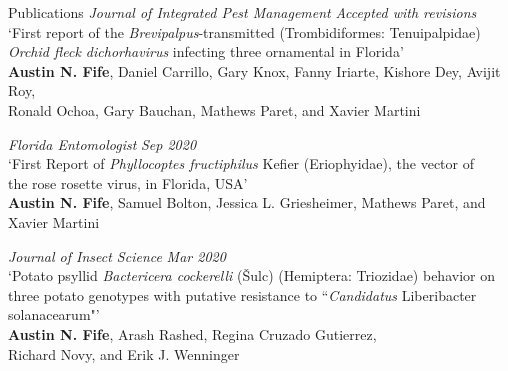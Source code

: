 \documentclass{resume} %
\begin{document}
\begin{rSection}{Publications}
\textit{Journal of Integrated Pest Management} \hfill {\em \textit{Accepted with revisions}}\\
`First report of the \textit{Brevipalpus}-transmitted (Trombidiformes: Tenuipalpidae)\\
\textit{Orchid fleck dichorhavirus} infecting three ornamental in Florida'\\
\textbf{Austin N. Fife}, Daniel Carrillo, Gary Knox, Fanny Iriarte, Kishore Dey, Avijit Roy,\\
 Ronald Ochoa, Gary Bauchan, Mathews Paret, and Xavier Martini \hfill
 
\textit{Florida Entomologist} \hfill {\em \textit{Sep 2020}}\\
`First Report of \textit{Phyllocoptes fructiphilus} Kefier (Eriophyidae), the vector of\\
the rose rosette virus, in Florida, USA'\\
\textbf{Austin N. Fife}, Samuel Bolton, Jessica L. Griesheimer, Mathews Paret, and Xavier Martini \hfill

\textit{Journal of Insect Science} \hfill {\em \textit{Mar 2020}}\\
`Potato psyllid \textit{Bactericera cockerelli} (Šulc) (Hemiptera: Triozidae) behavior on\\
 three potato genotypes with putative resistance to ``\textit{Candidatus} Liberibacter solanacearum"'\\
\textbf{Austin N. Fife}, Arash Rashed, Regina Cruzado Gutierrez,\\ Richard Novy, and Erik J. Wenninger

\end{rSection}
\end{document}
